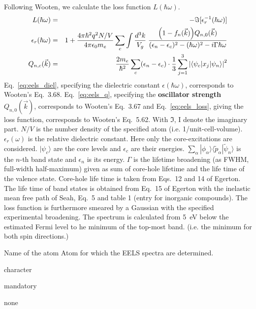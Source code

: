 \documentclass[final,12pt]{article}
\newcommand{\key}[1]{\hfill\break \makebox[1.5in][l]{\bf #1}\hfill\break}
\newcommand{\vdescr}[1]{\makebox[1in][l]{}\parbox[t]{110mm}{#1}\hfill\break}
\newcommand{\vformat}[1]{
\makebox[1in][l]{}\parbox[t]{110mm}{\makebox[1in][l]{Type:}\parbox[t]{2.7in}{#1}}
\hfill\break}
\newcommand{\vrules}[1]{
\makebox[1in][l]{}\parbox[t]{110mm}{\makebox[1in][l]{Rules:}\parbox[t]{2.7in}{#1}}
\hfill\break}
\newcommand{\vdefault}[1]{
\makebox[1in][l]{}\parbox[t]{110mm}
{\makebox[1in][l]{Default:}\parbox[t]{2.7in}{#1}}
\hfill\break}
\newcommand{\mbax}[1]{#1}
\begin{document}
Following Wooten\cite{wooten72_book}, we calculate
 the loss function $L(\hbar\omega)$.
  \begin{eqnarray}
  L(\hbar\omega)&=&-\Im[\epsilon^{-1}_r(\hbar\omega)]
\label{eq:eels_loss}
  \\
    \epsilon_r(\hbar\omega)&=&
1+\frac{4\pi\hbar^2 q^2 N/V}{4\pi\epsilon_0m_e}
\sum_c \int \frac{d^3k}{V_g}\;\frac{\Bigl(1-f_n(\vec{k})\Bigr)Q_{n,0}(\vec{k})}
{(\epsilon_{n}-\epsilon_{c})^2-(\hbar\omega)^2-i\Gamma\hbar\omega}
\label{eq:eels_diel}
\\
Q_{n,c}(\vec{k})&=&\frac{2m_e}{\hbar^2}\sum_c(\epsilon_n-\epsilon_c)
\cdot\frac{1}{3}\sum_{j=1}^3\left|\langle\psi_c|x_j|\psi_n\rangle\right|^2
\label{eq:eels_q}
  \end{eqnarray}
Eq.~\ref{eq:eels_diel}, specifying the dielectric constant
$\epsilon(\hbar\omega)$, corresponds to Wooten's Eq.~3.68.
Eq.~\ref{eq:eels_q}, specifying the \textbf{oscillator
  strength} $Q_{n,0}(\vec{k})$, corresponds
to Wooten's Eq.~3.67 and Eq.~\ref{eq:eels_loss}, giving the loss
function, corresponds to Wooten's Eq.~5.62. With $\Im$, I denote the
imaginary part. $N/V$ is the number density of the specified atom
(i.e. 1/unit-cell-volume). $\epsilon_r(\omega)$ is the relative
dielectric constant. Here only the core-excitations are considered.
$|\psi_c\rangle$ are the core levels and $\epsilon_c$ are their
energies. $\sum_\alpha|\phi_\alpha\rangle
\langle\tilde{p}_\alpha|\tilde{\psi}_n\rangle$ is the $n$-th band
state and $\epsilon_n$ is its energy. $\Gamma$ is the lifetime
broadening (as FWHM, full-width half-maximum) given as sum of
core-hole lifetime and the life time of the valence state. Core-hole
life time is taken from Eqs.~12 and 14 of
Egerton\cite{egerton07_ultramicroscopy107_565}. The life time of band
states is obtained from Eq.~15 of Egerton
\cite{egerton07_ultramicroscopy107_565} with the inelastic mean free
path of Seah\cite{seah79_surfinterfaceanal1_2}, Eq.~5 and table 1
(entry for inorganic compounds). The loss function is furthermore
smeared by a Gaussian with the specified experimental broadening.  The
spectrum is calculated from 5~eV below the estimated Fermi level to he
minimum of the top-most band. (i.e. the minimum for both spin
directions.)

\mbax{\key{ATOM} 
\vdescr{Name of the atom Atom for which the EELS spectra are determined.}
\vformat{character} 
\vrules{mandatory}
\vdefault{none}}
\end{document}
